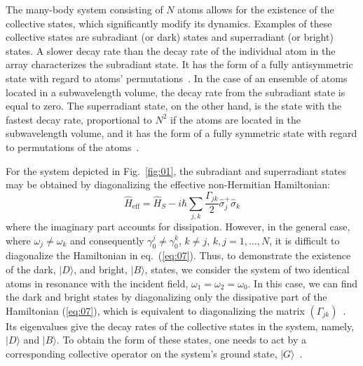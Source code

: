 \documentclass[aps,prl,twocolumn,superscriptaddress,showpacs,amsmath,amssymb]{revtex4-2}
\begin{document}
The many-body system consisting of $N$ atoms allows for the existence of the collective states, which significantly modify its dynamics. 
Examples of these collective states are subradiant (or dark) states and superradiant (or bright) states.
A slower decay rate than the decay rate of the individual atom in the array characterizes the subradiant state. It has the form of a fully antisymmetric state with regard to atoms' permutations~\cite{gross1982superradiance}.
In the case of an ensemble of atoms located in a subwavelength volume, the decay rate from the subradiant state is equal to zero.
The superradiant state, on the other hand, is the state with the fastest decay rate, proportional to $N^2$ if the atoms are located in the subwavelength volume, and it has the form of a fully symmetric state with regard to permutations of the atoms~\cite{gross1982superradiance}. 

For the system depicted in Fig.~\ref{fig:01}, the subradiant and superradiant states may be obtained by diagonalizing the effective non-Hermitian Hamiltonian:
\begin{equation} 
    \hat{H}_\mathrm{eff} = \hat{H}_S - i \hbar \sum_{j,k} \frac{\Gamma_{jk}}{2} \hat{\sigma}_j^+ \hat{\sigma}_k
    \label{eq:07}
\end{equation}
where the imaginary part accounts for dissipation.
However, in the general case, where $\omega_j \neq \omega_k$ and consequently $\gamma_0^j \neq \gamma_0^k$, $k \neq j$, $k,j = 1,\ldots, N$, it is difficult to diagonalize the Hamiltonian in eq.~(\ref{eq:07}).
Thus, to demonstrate the existence of the dark, $|D\rangle$, and bright, $|B\rangle$, states, we consider the system of two identical atoms in resonance with the incident field, $\omega_1 = \omega_2 = \omega_0$.
In this case, we can find the dark and bright states by diagonalizing only the dissipative part of the Hamiltonian (\ref{eq:07}), which is equivalent to diagonalizing the matrix $\left( \Gamma_{jk} \right)$~\cite{gross1982superradiance,carmichael2000quantum,clemens2003collective}.
Its eigenvalues give the decay rates of the collective states in the system, namely, $|D \rangle$ and $|B \rangle$.
To obtain the form of these states, one needs to act by a corresponding collective operator on the system's ground state, $|G\rangle$~\cite{carmichael2000quantum,clemens2003collective}.
\end{document}
